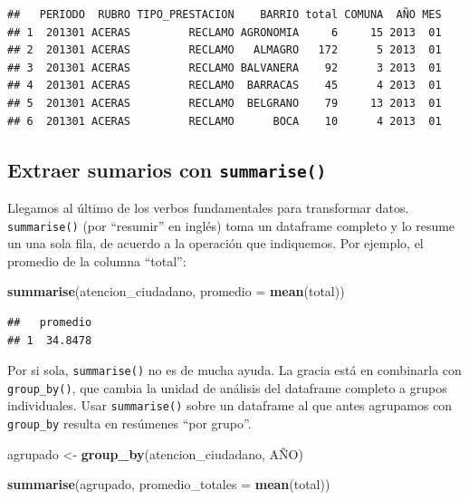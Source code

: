 \documentclass[]{book}
\newenvironment{Shaded}{\begin{snugshade}}{\end{snugshade}}
\newcommand{\KeywordTok}[1]{\textcolor[rgb]{0.13,0.29,0.53}{\textbf{#1}}}
\newcommand{\DataTypeTok}[1]{\textcolor[rgb]{0.13,0.29,0.53}{#1}}
\newcommand{\StringTok}[1]{\textcolor[rgb]{0.31,0.60,0.02}{#1}}
\newcommand{\NormalTok}[1]{#1}
\begin{document}
\begin{verbatim}
##   PERIODO  RUBRO TIPO_PRESTACION    BARRIO total COMUNA  AÑO MES
## 1  201301 ACERAS         RECLAMO AGRONOMIA     6     15 2013  01
## 2  201301 ACERAS         RECLAMO   ALMAGRO   172      5 2013  01
## 3  201301 ACERAS         RECLAMO BALVANERA    92      3 2013  01
## 4  201301 ACERAS         RECLAMO  BARRACAS    45      4 2013  01
## 5  201301 ACERAS         RECLAMO  BELGRANO    79     13 2013  01
## 6  201301 ACERAS         RECLAMO      BOCA    10      4 2013  01
\end{verbatim}

\subsection{\texorpdfstring{Extraer sumarios con
\texttt{summarise()}}{Extraer sumarios con summarise()}}\label{extraer-sumarios-con-summarise}

Llegamos al último de los verbos fundamentales para transformar datos.
\texttt{summarise()} (por ``resumir'' en inglés) toma un dataframe
completo y lo resume un una sola fila, de acuerdo a la operación que
indiquemos. Por ejemplo, el promedio de la columna ``total'':

\begin{Shaded}
\begin{Highlighting}[]
\KeywordTok{summarise}\NormalTok{(atencion_ciudadano, }\DataTypeTok{promedio =} \KeywordTok{mean}\NormalTok{(total))}
\end{Highlighting}
\end{Shaded}

\begin{verbatim}
##   promedio
## 1  34.8478
\end{verbatim}

Por si sola, \texttt{summarise()} no es de mucha ayuda. La gracia está
en combinarla con \texttt{group\_by()}, que cambia la unidad de análisis
del dataframe completo a grupos individuales. Usar \texttt{summarise()}
sobre un dataframe al que antes agrupamos con \texttt{group\_by} resulta
en resúmenes ``por grupo''.

\begin{Shaded}
\begin{Highlighting}[]
\NormalTok{agrupado <-}\StringTok{ }\KeywordTok{group_by}\NormalTok{(atencion_ciudadano, AÑO)}

\KeywordTok{summarise}\NormalTok{(agrupado, }\DataTypeTok{promedio_totales =} \KeywordTok{mean}\NormalTok{(total))}
\end{Highlighting}
\end{Shaded}
\end{document}
